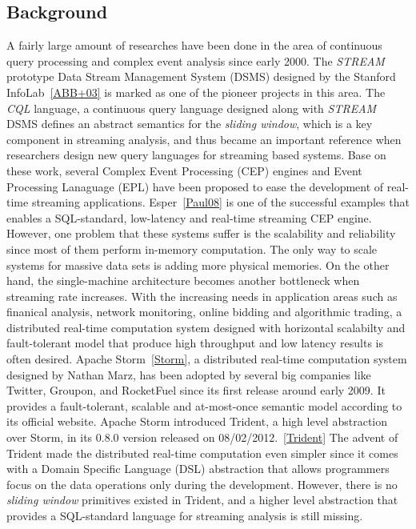 \documentclass[conference, twocolumn, twoside, 11pt]{IEEEtran}
\theoremstyle{definition}
\begin{document}
\subsection{Background}
A fairly large amount of researches have been done in the area of continuous query processing and complex event analysis since early 2000. The \emph{STREAM} prototype Data Stream Management System (DSMS)
designed by the Stanford InfoLab~\ref{ABB+03} is marked as one of the pioneer projects in this area. The \emph{CQL} language, a continuous query language designed along with \emph{STREAM} DSMS defines an abstract semantics for the \emph{sliding window}, which is a key component in streaming analysis, and thus became an important reference when researchers design new query languages for streaming based systems. Base on these work, several Complex Event Processing (CEP) engines and Event Processing Lanaguage (EPL) have been proposed to ease the development of real-time streaming applications. Esper~\ref{Paul08} is one of the successful examples that enables a SQL-standard, low-latency and real-time streaming CEP engine. However, one problem that these systems suffer is the scalability and reliability since most of them perform in-memory computation. The only way to scale systems for massive data sets is adding more physical memories. On the other hand, the single-machine architecture becomes another bottleneck when streaming rate increases. With the increasing needs in application areas such as finanical analysis, network monitoring, online bidding and algorithmic trading, a distributed real-time computation system designed with horizontal scalabilty and fault-tolerant model that produce high throughput and low latency results is often desired. Apache Storm~\ref{Storm}, a distributed real-time computation system designed by Nathan Marz, has been adopted by several big companies like Twitter, Groupon, and RocketFuel since its first release around early 2009. It provides a fault-tolerant, scalable and at-most-once semantic model according to its official website. Apache Storm introduced Trident, a high level abstraction over Storm, in its 0.8.0 version released on 08/02/2012.~\ref{Trident} The advent of Trident made the distributed real-time computation even simpler since it comes with a Domain Specific Language (DSL) abstraction that allows programmers focus on the data operations only during the development. However, there is no \emph{sliding window} primitives existed in Trident, and a higher level abstraction that provides a SQL-standard language for streaming analysis is still missing.
\end{document}
